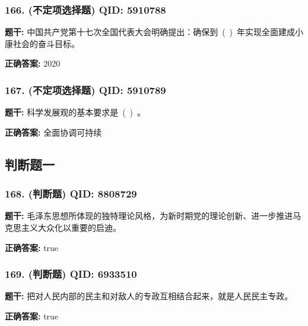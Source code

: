 \documentclass[12pt,UTF8]{ctexart}
\begin{document}
\subsubsection*{166. (不定项选择题) \small QID: 5910788}

\textbf{题干:}
中国共产党第十七次全国代表大会明确提出：确保到 ( ) 年实现全面建成小康社会的奋斗目标。

\textbf{正确答案:}
2020

\vspace{0.3em}\hrulefill\vspace{0.7em}

\subsubsection*{167. (不定项选择题) \small QID: 5910789}

\textbf{题干:}
科学发展观的基本要求是 ( ) 。

\textbf{正确答案:}
全面协调可持续

\vspace{0.3em}\hrulefill\vspace{0.7em}

\subsection*{判断题一}

\subsubsection*{168. (判断题) \small QID: 8808729}

\textbf{题干:}
毛泽东思想所体现的独特理论风格，为新时期党的理论创新、进一步推进马克思主义大众化以重要的启迪。

\textbf{正确答案:}
true

\vspace{0.3em}\hrulefill\vspace{0.7em}

\subsubsection*{169. (判断题) \small QID: 6933510}

\textbf{题干:}
把对人民内部的民主和对敌人的专政互相结合起来，就是人民民主专政。

\textbf{正确答案:}
true

\vspace{0.3em}\hrulefill\vspace{0.7em}
\end{document}
